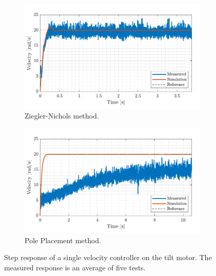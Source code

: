 \documentclass[../../main.tex]{subfiles}
\begin{document}
\begin{figure}[H]
     \centering
     \begin{subfigure}[b]{0.49\textwidth}
         \centering
         \includegraphics[width=\textwidth]{Sections/Test/Images/VelControllerTestZN.pdf}
         \caption{Ziegler-Nichols method.}
         \label{fig:StepVelZN}
     \end{subfigure}
     \hfill
     \begin{subfigure}[b]{0.49\textwidth}
         \centering
         \includegraphics[width=\textwidth]{Sections/Test/Images/VelControllerTestPP.pdf}
         \caption{Pole Placement method.}
         \label{fig:StepVelModel}
     \end{subfigure}
        \caption{Step response of a single velocity controller on the tilt motor. The measured response is an average of five tests.}
        \label{fig:VelocityTilt}
\end{figure}
\end{document}
